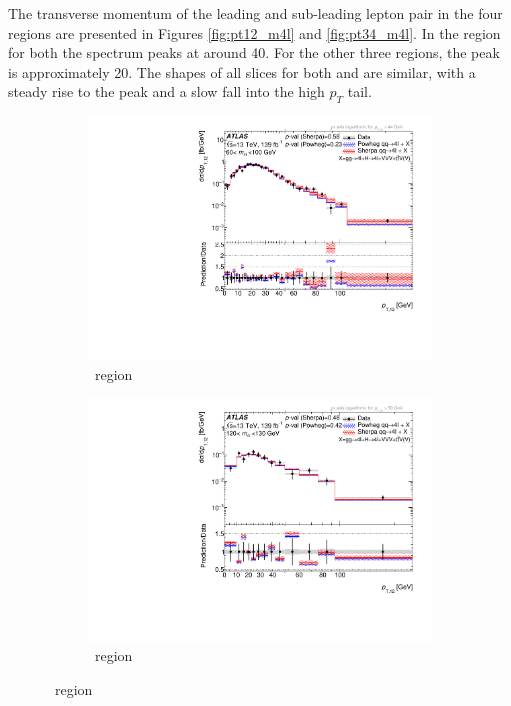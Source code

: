 The transverse momentum of the leading and sub-leading lepton pair in the four \mFourL{} regions are presented in Figures \ref{fig:pt12_m4l} and \ref{fig:pt34_m4l}. In the \onshellZZ{} region for both the spectrum peaks at around \unit{40}{\GeV}. For the other three regions, the peak is approximately \unit{20}{\GeV}. The shapes of all slices for both \ptZOne{} and \ptZTwo{} are similar, with a steady rise to the peak and a slow fall into the high $p_T$ tail.
\begin{figure}[htb!]
    \begin{subfigure}{.49\textwidth}\centering
      \includegraphics[width=.99\linewidth]{Figures/m4l/UnfoldedResults/linlog_Unfolded_Data_pt12_m4l60-100.pdf}\caption{\ZFourL \ region}\label{fig:sub-first}
    \end{subfigure}
    \begin{subfigure}{.49\textwidth}\centering
      \includegraphics[width=.99\linewidth]{Figures/m4l/UnfoldedResults/linlog_Unfolded_Data_pt12_m4l120-130.pdf} \caption{\HFourL \ region}\label{fig:sub-second}

\end{subfigure}
\end{figure}
